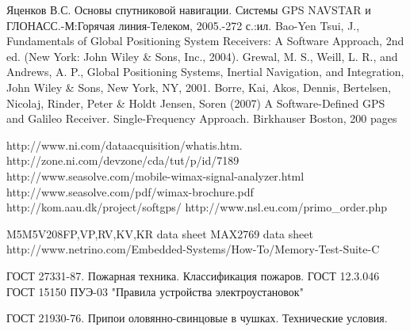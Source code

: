 \begin{thebibliography}{99}
 Яценков В.С. Основы спутниковой навигации. Системы GPS NAVSTAR и ГЛОНАСС.-М:Горячая линия-Телеком, 2005.-272 с.:ил.
 Bao-Yen Tsui, J., Fundamentals of Global Positioning System Receivers: A Software Approach, 2nd ed. (New York: John Wiley \& Sons, Inc., 2004).
 Grewal, M. S., Weill, L. R., and Andrews, A. P., Global Positioning Systems, Inertial Navigation, and Integration, John Wiley \& Sons, New York, NY, 2001.
 Borre, Kai, Akos, Dennis, Bertelsen, Nicolaj, Rinder, Peter \& Holdt Jensen, Soren (2007) A Software-Defined GPS and Galileo Receiver. Single-Frequency Approach. Birkhauser Boston, 200 pages

 http://www.ni.com/dataacquisition/whatis.htm.
 http://zone.ni.com/devzone/cda/tut/p/id/7189
 http://www.seasolve.com/mobile-wimax-signal-analyzer.html
 http://www.seasolve.com/pdf/wimax-brochure.pdf
 http://kom.aau.dk/project/softgps/
 http://www.nsl.eu.com/primo\_order.php

 M5M5V208FP,VP,RV,KV,KR data sheet
 MAX2769 data sheet
 http://www.netrino.com/Embedded-Systems/How-To/Memory-Test-Suite-C

 ГОСТ 27331-87. Пожарная техника. Классификация пожаров.
 ГОСТ 12.3.046
 ГОСТ 15150
 ПУЭ-03 "Правила устройства электроустановок"

 ГОСТ 21930-76. Припои оловянно-свинцовые в чушках. Технические условия.
\end{thebibliography}
